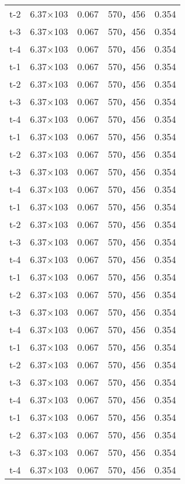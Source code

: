\begin{longtable}{ccccc}
t-2     &6.37×103       &0.067  &570，456        &0.354\\
t-3     &6.37×103       &0.067  &570，456        &0.354\\
t-4     &6.37×103       &0.067  &570，456        &0.354\\
t-1     &6.37×103       &0.067  &570，456        &0.354\\
t-2     &6.37×103       &0.067  &570，456        &0.354\\
t-3     &6.37×103       &0.067  &570，456        &0.354\\
t-4     &6.37×103       &0.067  &570，456        &0.354\\
t-1     &6.37×103       &0.067  &570，456        &0.354\\
t-2     &6.37×103       &0.067  &570，456        &0.354\\
t-3     &6.37×103       &0.067  &570，456        &0.354\\
t-4     &6.37×103       &0.067  &570，456        &0.354\\
t-1     &6.37×103       &0.067  &570，456        &0.354\\
t-2     &6.37×103       &0.067  &570，456        &0.354\\
t-3     &6.37×103       &0.067  &570，456        &0.354\\
t-4     &6.37×103       &0.067  &570，456        &0.354\\
t-1     &6.37×103       &0.067  &570，456        &0.354\\
t-2     &6.37×103       &0.067  &570，456        &0.354\\
t-3     &6.37×103       &0.067  &570，456        &0.354\\
t-4     &6.37×103       &0.067  &570，456        &0.354\\
t-1     &6.37×103       &0.067  &570，456        &0.354\\
t-2     &6.37×103       &0.067  &570，456        &0.354\\
t-3     &6.37×103       &0.067  &570，456        &0.354\\
t-4     &6.37×103       &0.067  &570，456        &0.354\\
t-1     &6.37×103       &0.067  &570，456        &0.354\\
t-2     &6.37×103       &0.067  &570，456        &0.354\\
t-3     &6.37×103       &0.067  &570，456        &0.354\\
t-4     &6.37×103       &0.067  &570，456        &0.354\\

\end{longtable}

